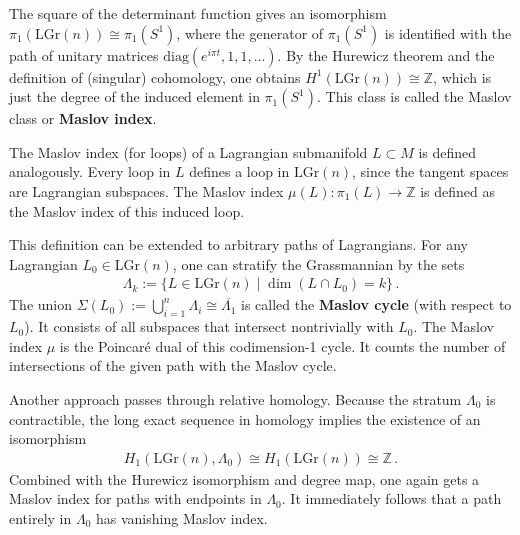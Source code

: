     \begin{property}
        The square of the determinant function gives an isomorphism $\pi_1(\mathrm{LGr}(n))\cong\pi_1(S^1)$, where the generator of $\pi_1(S^1)$ is identified with the path of unitary matrices $\mathrm{diag}(e^{i\pi t},1,1,\ldots)$. By the Hurewicz theorem and the definition of (singular) cohomology, one obtains $H^1(\mathrm{LGr}(n))\cong\mathbb{Z}$, which is just the degree of the induced element in $\pi_1(S^1)$. This class is called the Maslov class or \textbf{Maslov index}.

        The Maslov index (for loops) of a Lagrangian submanifold $L\subset M$ is defined analogously. Every loop in $L$ defines a loop in $\mathrm{LGr}(n)$, since the tangent spaces are Lagrangian subspaces. The Maslov index $\mu(L):\pi_1(L)\rightarrow\mathbb{Z}$ is defined as the Maslov index of this induced loop.

        This definition can be extended to arbitrary paths of Lagrangians. For any Lagrangian $L_0\in\mathrm{LGr}(n)$, one can stratify the Grassmannian by the sets
        \begin{gather}
            \Lambda_k := \{L\in\mathrm{LGr}(n)\mid\dim(L\cap L_0) = k\}\,.
        \end{gather}
        The union $\Sigma(L_0):=\bigcup_{i=1}^n\Lambda_i\cong\overline{\Lambda_1}$ is called the \textbf{Maslov cycle} (with respect to $L_0$). It consists of all subspaces that intersect nontrivially with $L_0$. The Maslov index $\mu$ is the Poincar\'e dual of this codimension-1 cycle. It counts the number of intersections of the given path with the Maslov cycle.

        Another approach passes through relative homology. Because the stratum $\Lambda_0$ is contractible, the long exact sequence in homology implies the existence of an isomorphism
        \begin{gather}
            H_1(\mathrm{LGr}(n),\Lambda_0)\cong H_1(\mathrm{LGr}(n))\cong\mathbb{Z}\,.
        \end{gather}
        Combined with the Hurewicz isomorphism and degree map, one again gets a Maslov index for paths with endpoints in $\Lambda_0$. It immediately follows that a path entirely in $\Lambda_0$ has vanishing Maslov index.
    \end{property}

